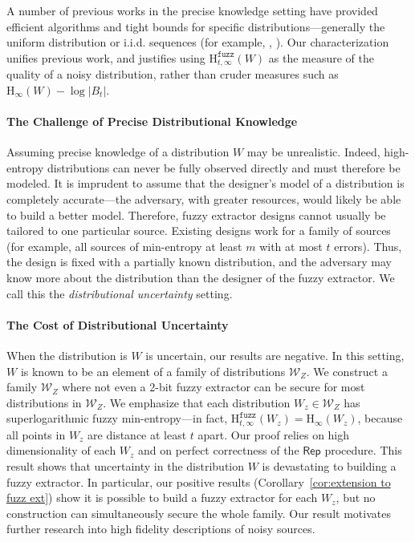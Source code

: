 \documentclass[11pt]{article}
\newcommand{\corref}[1]{\mbox{Corollary~\ref{#1}}}
\newcommand{\class}[1]{{\ensuremath{\mathsf{#1}}}}
\newcommand{\rep}{\ensuremath{\class{Rep}}\xspace}
\newcommand{\Hoo}{\mathrm{H}_\infty}
\newcommand{\Hfuzz}{\mathrm{H}^{\mathtt{fuzz}}_{t,\infty}}
\begin{document}
A number of previous works in the precise knowledge setting have provided efficient algorithms and
tight bounds for specific distributions---generally the uniform distribution or
i.i.d. sequences (for example, \cite{JW99,LT03,DBLP:conf/eccv/TuylsG04,hao2006combining}, \cite{DBLP:journals/corr/abs-1112-5630,IgnatenkoW2012}). 
Our characterization unifies previous work, and justifies using $\Hfuzz(W)$ as the measure of the quality of a noisy distribution,  rather than cruder measures such as $\Hoo(W)-\log |B_t|$. 

\paragraph{The Challenge of Precise Distributional Knowledge}
Assuming precise knowledge of a distribution $W$ may be unrealistic. Indeed, high-entropy distributions can never be fully observed directly and must therefore be modeled. It is imprudent to assume that the designer's model of a distribution is completely accurate---the adversary, with greater resources, would likely be able to build a better model. Therefore, fuzzy extractor designs cannot usually be tailored to one  particular source. Existing designs work for a family of sources (for example, all sources of min-entropy at least $m$ with at most $t$ errors). Thus, the design is fixed with a partially known distribution, and the adversary may know more about the distribution than the designer of the fuzzy extractor.  We call this the \emph{distributional uncertainty} setting.

\paragraph{The Cost of Distributional Uncertainty}
When the distribution is $W$ is uncertain, our results are negative.   In this setting, $W$ is known to be an element of a family of distributions $\mathcal{W}_Z$.
We construct a family $\mathcal{W}_Z$ where not even a 2-bit fuzzy extractor can be secure for most distributions in  $\mathcal{W}_Z$.  We emphasize that each distribution $W_z\in \mathcal{W}_Z$ has superlogarithmic fuzzy min-entropy---in fact, $\Hfuzz(W_z)=\Hoo(W_z)$, because all points in $W_z$ are distance at least $t$ apart. Our proof relies on high dimensionality of each $W_z$ and on perfect correctness of the $\rep$ procedure.
This result shows that uncertainty in the distribution $W$ is devastating to building a fuzzy extractor.  In particular, our positive results (\corref{cor:extension to fuzz ext}) show it is possible to build a fuzzy extractor for each $W_z$, but no construction can simultaneously secure the whole family.  Our result motivates further research into high fidelity descriptions of noisy sources.
\end{document}
